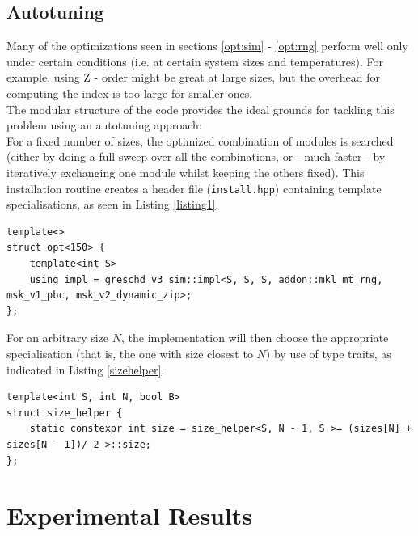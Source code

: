 \documentclass[letterpaper]{article}
\begin{document}
\subsection{Autotuning}
Many of the optimizations seen in sections \ref{opt:sim} - \ref{opt:rng} perform well only under certain conditions (i.e. at certain system sizes and temperatures). For example, using Z - order might be great at large sizes, but the overhead for computing the index is too large for smaller ones. \\
The modular structure of the code provides the ideal grounds for tackling this problem using an autotuning approach:\\
For a fixed number of sizes, the optimized combination of modules is searched (either by doing a full sweep over all the combinations, or - much faster - by iteratively exchanging one module whilst keeping the others fixed). This installation routine creates a header file (\texttt{install.hpp}) containing template specialisations, as seen in Listing \ref{listing1}.
\begin{lstlisting}[caption = {example for a template specialisation}, label = listing1]
template<>
struct opt<150> {
    template<int S>
    using impl = greschd_v3_sim::impl<S, S, S, addon::mkl_mt_rng, msk_v1_pbc, msk_v2_dynamic_zip>; 
};
\end{lstlisting}
For an arbitrary size $N$, the implementation will then choose the appropriate specialisation (that is, the one with size closest to $N$) by use of type traits, as indicated in Listing \ref{sizehelper}.
\begin{lstlisting}[label = sizehelper, caption = {size\_helper, part of the type traits}]
template<int S, int N, bool B>
struct size_helper {
    static constexpr int size = size_helper<S, N - 1, S >= (sizes[N] + sizes[N - 1])/ 2 >::size;
};
\end{lstlisting}
\section{Experimental Results}\label{sec:exp}
\end{document}
